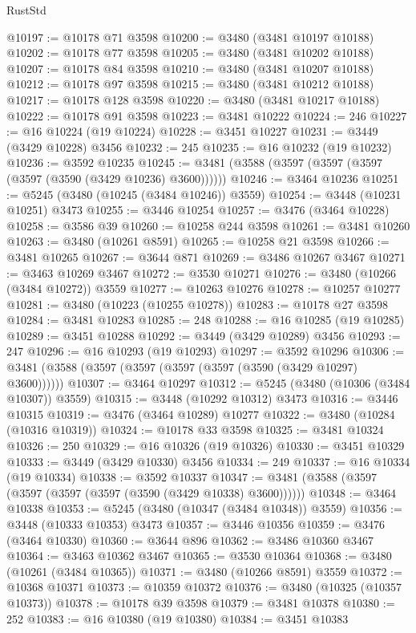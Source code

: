 \begin{lexlean}{RustStd}
\begin{coremodule}
{{{{{{{{{{{{{{{{{{{@10197 := @10178 @71 @3598
@10200 := @3480 (@3481 @10197 @10188)
@10202 := @10178 @77 @3598
@10205 := @3480 (@3481 @10202 @10188)
@10207 := @10178 @84 @3598
@10210 := @3480 (@3481 @10207 @10188)
@10212 := @10178 @97 @3598
@10215 := @3480 (@3481 @10212 @10188)
@10217 := @10178 @128 @3598
@10220 := @3480 (@3481 @10217 @10188)
@10222 := @10178 @91 @3598
@10223 := @3481 @10222
@10224 := 246
@10227 := @16 @10224 (@19 @10224)
@10228 := @3451 @10227
@10231 := @3449 (@3429 @10228) @3456
@10232 := 245
@10235 := @16 @10232 (@19 @10232)
@10236 := @3592 @10235
@10245 := @3481 (@3588 (@3597 (@3597 (@3597 (@3597 (@3590 (@3429 @10236) @3600))))))
@10246 := @3464 @10236
@10251 := @5245 (@3480 (@10245 (@3484 @10246)) @3559)
@10254 := @3448 (@10231 @10251) @3473
@10255 := @3446 @10254
@10257 := @3476 (@3464 @10228)
@10258 := @3586 @39
@10260 := @10258 @244 @3598
@10261 := @3481 @10260
@10263 := @3480 (@10261 @8591)
@10265 := @10258 @21 @3598
@10266 := @3481 @10265
@10267 := @3644 @871
@10269 := @3486 @10267 @3467
@10271 := @3463 @10269 @3467
@10272 := @3530 @10271
@10276 := @3480 (@10266 (@3484 @10272)) @3559
@10277 := @10263 @10276
@10278 := @10257 @10277
@10281 := @3480 (@10223 (@10255 @10278))
@10283 := @10178 @27 @3598
@10284 := @3481 @10283
@10285 := 248
@10288 := @16 @10285 (@19 @10285)
@10289 := @3451 @10288
@10292 := @3449 (@3429 @10289) @3456
@10293 := 247
@10296 := @16 @10293 (@19 @10293)
@10297 := @3592 @10296
@10306 := @3481 (@3588 (@3597 (@3597 (@3597 (@3597 (@3590 (@3429 @10297) @3600))))))
@10307 := @3464 @10297
@10312 := @5245 (@3480 (@10306 (@3484 @10307)) @3559)
@10315 := @3448 (@10292 @10312) @3473
@10316 := @3446 @10315
@10319 := @3476 (@3464 @10289) @10277
@10322 := @3480 (@10284 (@10316 @10319))
@10324 := @10178 @33 @3598
@10325 := @3481 @10324
@10326 := 250
@10329 := @16 @10326 (@19 @10326)
@10330 := @3451 @10329
@10333 := @3449 (@3429 @10330) @3456
@10334 := 249
@10337 := @16 @10334 (@19 @10334)
@10338 := @3592 @10337
@10347 := @3481 (@3588 (@3597 (@3597 (@3597 (@3597 (@3590 (@3429 @10338) @3600))))))
@10348 := @3464 @10338
@10353 := @5245 (@3480 (@10347 (@3484 @10348)) @3559)
@10356 := @3448 (@10333 @10353) @3473
@10357 := @3446 @10356
@10359 := @3476 (@3464 @10330)
@10360 := @3644 @896
@10362 := @3486 @10360 @3467
@10364 := @3463 @10362 @3467
@10365 := @3530 @10364
@10368 := @3480 (@10261 (@3484 @10365))
@10371 := @3480 (@10266 @8591) @3559
@10372 := @10368 @10371
@10373 := @10359 @10372
@10376 := @3480 (@10325 (@10357 @10373))
@10378 := @10178 @39 @3598
@10379 := @3481 @10378
@10380 := 252
@10383 := @16 @10380 (@19 @10380)
@10384 := @3451 @10383
}}}}}}}}}}}}}}}}}}}
\end{coremodule}
\end{lexlean}
